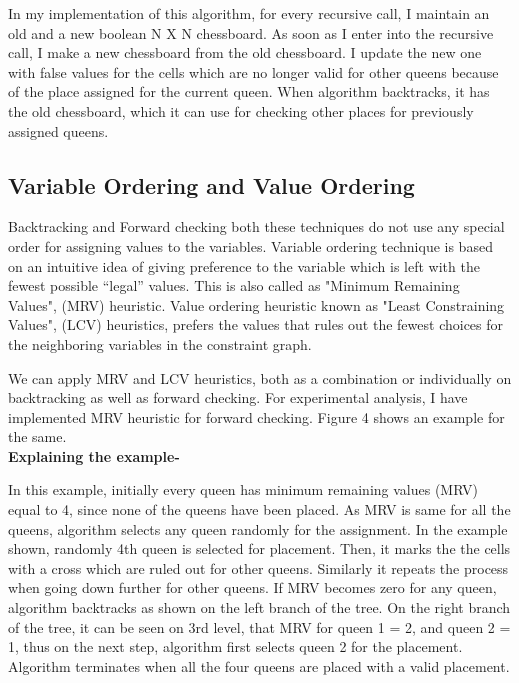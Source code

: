\documentclass[conference]{IEEEtran}
\begin{document}
In my implementation of this algorithm, for every recursive call, I maintain an old and a new boolean N X N chessboard. As soon as I enter into the recursive call, I make a new chessboard from the old chessboard. I update the new one with false values for the cells which are no longer valid for other queens because of the place assigned for the current queen. When algorithm backtracks, it has the old chessboard, which it can use for checking other places for previously assigned queens.

\subsection{Variable Ordering and Value Ordering}

Backtracking and Forward checking both these techniques do not use any special order for assigning values to the variables. Variable ordering technique is based on an intuitive idea of giving preference to the variable which is left with the fewest possible “legal” values. This is also called as "Minimum Remaining Values", (MRV) heuristic. Value ordering heuristic known as "Least Constraining Values", (LCV) heuristics,  prefers the values that rules out the fewest choices for the neighboring variables in the constraint graph.

We can apply MRV and LCV heuristics, both as a combination or individually on backtracking as well as forward checking. For experimental analysis, I have implemented MRV heuristic for forward checking. Figure  4 shows an example for the same. \\

\textbf {Explaining the example- }

In this example, initially every queen has minimum remaining values (MRV) equal to 4, since none of the queens have been placed. As MRV is same for all the queens, algorithm selects any queen randomly for the assignment. In the example shown, randomly 4th queen is selected for placement. Then, it marks the the cells with a cross which are ruled out for other queens. Similarly it repeats the process when going down further for other queens. If MRV becomes zero for any queen, algorithm backtracks as shown on the left branch of the tree. On the right branch of the tree, it can be seen on 3rd level, that MRV for queen 1 = 2, and queen 2 = 1, thus on the next step, algorithm first selects queen 2 for the placement.
\\Algorithm terminates when all the four queens are placed with a valid placement. 
\end{document}
